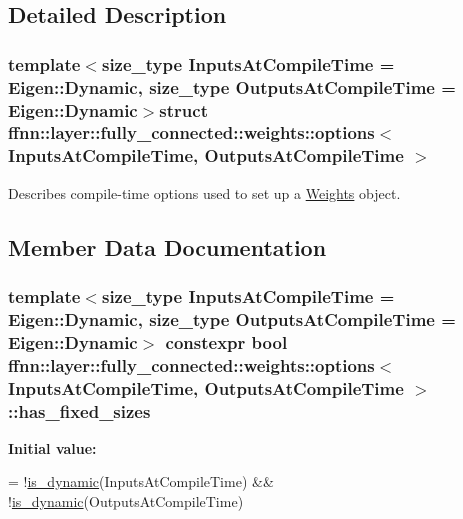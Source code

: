 \subsection{Detailed Description}
\subsubsection*{template$<$size\-\_\-type Inputs\-At\-Compile\-Time = Eigen\-::\-Dynamic, size\-\_\-type Outputs\-At\-Compile\-Time = Eigen\-::\-Dynamic$>$struct ffnn\-::layer\-::fully\-\_\-connected\-::weights\-::options$<$ Inputs\-At\-Compile\-Time, Outputs\-At\-Compile\-Time $>$}

Describes compile-\/time options used to set up a \hyperlink{classffnn_1_1layer_1_1fully__connected_1_1_weights}{Weights} object. 

\subsection{Member Data Documentation}
\hypertarget{structffnn_1_1layer_1_1fully__connected_1_1weights_1_1options_acb66c282ebaa5f29ce34d14b68551b94}{
\subsubsection[{has\-\_\-fixed\-\_\-sizes}]{\setlength{\rightskip}{0pt plus 5cm}template$<$size\-\_\-type Inputs\-At\-Compile\-Time = Eigen\-::\-Dynamic, size\-\_\-type Outputs\-At\-Compile\-Time = Eigen\-::\-Dynamic$>$ constexpr bool {\bf ffnn\-::layer\-::fully\-\_\-connected\-::weights\-::options}$<$ Inputs\-At\-Compile\-Time, Outputs\-At\-Compile\-Time $>$\-::has\-\_\-fixed\-\_\-sizes\hspace{0.3cm}{\ttfamily [static]}}}\label{structffnn_1_1layer_1_1fully__connected_1_1weights_1_1options_acb66c282ebaa5f29ce34d14b68551b94}
{\bfseries Initial value\-:}
\begin{DoxyCode}
= !\hyperlink{namespaceffnn_1_1layer_a83ba223c7b7eb8e3d926b98b266f24c8}{is\_dynamic}(InputsAtCompileTime) &&
                                          !\hyperlink{namespaceffnn_1_1layer_a83ba223c7b7eb8e3d926b98b266f24c8}{is\_dynamic}(OutputsAtCompileTime)
\end{DoxyCode}


